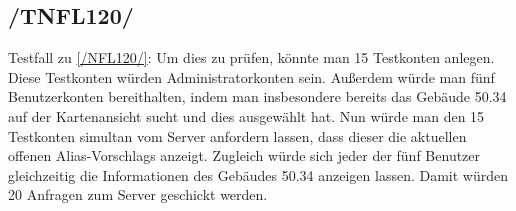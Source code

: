 \subsection*{/TNFL120/}
\label{/TNFL120/} Testfall zu \ref{/NFL120/}: Um dies zu prüfen, könnte man 15 Testkonten anlegen. Diese Testkonten würden \Gls{Administrator}konten sein. Außerdem würde man fünf \Gls{Benutzer}konten bereithalten, indem man insbesondere bereits das Gebäude 50.34 auf der \Gls{Kartenansicht} sucht und dies ausgewählt hat. Nun würde man den 15 Testkonten \gls{simultan} vom \Gls{Server} anfordern lassen, dass dieser die aktuellen offenen \Glspl{Alias-Vorschlag} anzeigt. Zugleich würde sich jeder der fünf \Gls{Benutzer} gleichzeitig die Informationen des Gebäudes 50.34 anzeigen lassen. Damit würden 20 Anfragen zum \Gls{Server} geschickt werden.
